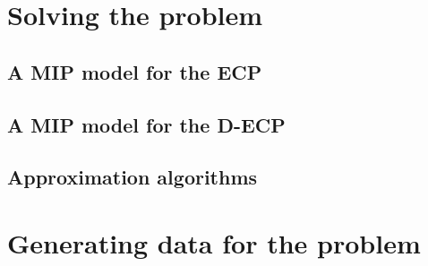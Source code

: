 \section{Solving the problem}%
\label{sec:solving_the_problem}

\subsection{A MIP model for the ECP}%
\label{sub:a_mip_model_for_the_ecp}

\subsection{A MIP model for the D-ECP}%
\label{sub:a_mip_model_for_the_ecp}

\subsection{Approximation algorithms}%
\label{sub:approximation_algorithms}

\section{Generating data for the problem}%
\label{sec:generating_data_for_the_problem}



